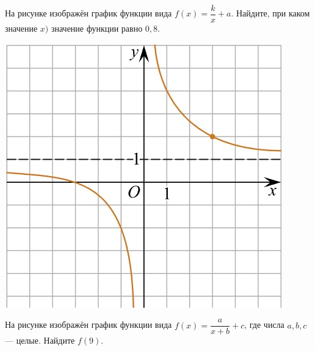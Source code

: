 \begin{class}[number=5]
	\begin{listofex}
		\item
		\begin{minipage}[t]{0.67\textwidth}
			На рисунке изображён график функции вида \(f(x)=\dfrac{k}{x}+a\). Найдите, при каком значение \(x)\) значение функции равно \(0,8\).
		\end{minipage}
		\begin{minipage}[c]{0.25\textwidth}
			\includegraphics[align=t, width=\textwidth]{pics/G101M4C5-1.jpg}
		\end{minipage}
		\item
		\begin{minipage}[t]{0.67\textwidth}
			На рисунке изображён график функции вида \(f(x)=\dfrac{a}{x+b}+c\), где числа \(a, b, c\) --- целые. Найдите \(f(9)\).
		\end{minipage}
		\begin{minipage}[c]{0.25\textwidth}

\end{minipage}
\end{listofex}
\end{class}
